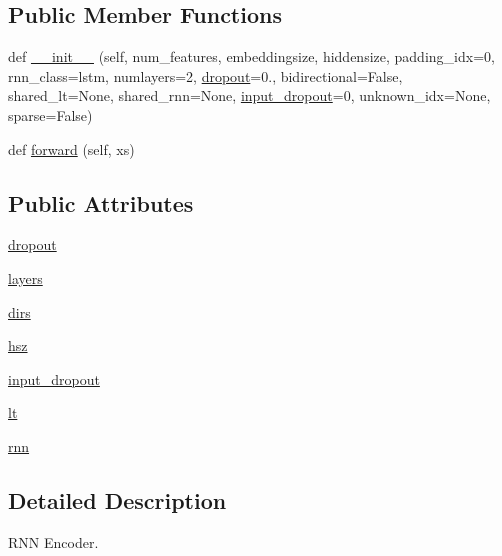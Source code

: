 \subsection*{Public Member Functions}
\begin{DoxyCompactItemize}
\item 
def \hyperlink{classcontrollable__seq2seq_1_1modules_1_1RNNEncoder_a3769fbcd25b4fca433ee27b17550e996}{\+\_\+\+\_\+init\+\_\+\+\_\+} (self, num\+\_\+features, embeddingsize, hiddensize, padding\+\_\+idx=0, rnn\+\_\+class=\textquotesingle{}lstm\textquotesingle{}, numlayers=2, \hyperlink{classcontrollable__seq2seq_1_1modules_1_1RNNEncoder_abd2737e3e6a9890aefcebb0e82e71a81}{dropout}=0., bidirectional=False, shared\+\_\+lt=None, shared\+\_\+rnn=None, \hyperlink{classcontrollable__seq2seq_1_1modules_1_1RNNEncoder_a71bc2d6b4a2057a28d05c21e1e456084}{input\+\_\+dropout}=0, unknown\+\_\+idx=None, sparse=False)
\item 
def \hyperlink{classcontrollable__seq2seq_1_1modules_1_1RNNEncoder_a4f74c2dfb1db01950eea3907de66ab5d}{forward} (self, xs)
\end{DoxyCompactItemize}
\subsection*{Public Attributes}
\begin{DoxyCompactItemize}
\item 
\hyperlink{classcontrollable__seq2seq_1_1modules_1_1RNNEncoder_abd2737e3e6a9890aefcebb0e82e71a81}{dropout}
\item 
\hyperlink{classcontrollable__seq2seq_1_1modules_1_1RNNEncoder_a2ed52c9c67b263d1ea0bedb6446e2e0b}{layers}
\item 
\hyperlink{classcontrollable__seq2seq_1_1modules_1_1RNNEncoder_a9c2de17fa143fbfb10900ef0ed05cec2}{dirs}
\item 
\hyperlink{classcontrollable__seq2seq_1_1modules_1_1RNNEncoder_a8e9c3361259677d4fd32bf16f2c52ca1}{hsz}
\item 
\hyperlink{classcontrollable__seq2seq_1_1modules_1_1RNNEncoder_a71bc2d6b4a2057a28d05c21e1e456084}{input\+\_\+dropout}
\item 
\hyperlink{classcontrollable__seq2seq_1_1modules_1_1RNNEncoder_a7c083c7ef40078795a99ae87f429e1e4}{lt}
\item 
\hyperlink{classcontrollable__seq2seq_1_1modules_1_1RNNEncoder_a096201c636aa524910b39167d3c29380}{rnn}
\end{DoxyCompactItemize}


\subsection{Detailed Description}
\begin{DoxyVerb}RNN Encoder.\end{DoxyVerb}
 

